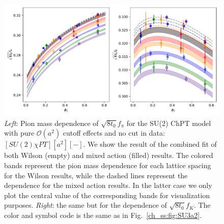 \begin{figure}
    \centering
    \includegraphics[width=1.\textwidth]{./cap5/figs/SU2_comb.pdf}
    \caption{\textit{Left}: Pion mass dependence of $\sqrt{8t_0}f_{\pi}$ for the SU(2) ChPT model with pure $\mathcal{O}(a^2)$ cutoff effects and no cut in data: $[SU(2)\chi PT][a^2][-]$. We show the result of the combined fit of both Wilson (empty) and mixed action (filled) results. The colored bands represent the pion mass dependence for each lattice spacing for the Wilson results, while the dashed lines represent the dependence for the mixed action results. In the latter case we only plot the central value of the corresponding bands for visualization purposes. \textit{Right}: the same but for the dependence of $\sqrt{8t_0}f_{K}$. The color and symbol code is the same as in Fig.~\ref{ch_ss:fig:SU3a2}.}
    \label{ch_ss:fig:SU2_comb}
\end{figure}

